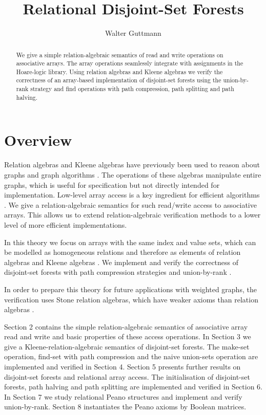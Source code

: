 \documentclass[11pt,a4paper]{article}
\begin{document}
\title{Relational Disjoint-Set Forests}
\author{Walter Guttmann}
\maketitle

\begin{abstract}
  We give a simple relation-algebraic semantics of read and write operations on associative arrays.
  The array operations seamlessly integrate with assignments in the Hoare-logic library.
  Using relation algebras and Kleene algebras we verify the correctness of an array-based implementation of disjoint-set forests using the union-by-rank strategy and find operations with path compression, path splitting and path halving.
\end{abstract}

\tableofcontents

\section{Overview}

Relation algebras and Kleene algebras have previously been used to reason about graphs and graph algorithms \cite{BackhouseCarre1975,Berghammer1999,BerghammerStruth2010,BerghammerKargerWolf1998,GondranMinoux2008,HoefnerMoeller2012,Moeller1993}.
The operations of these algebras manipulate entire graphs, which is useful for specification but not directly intended for implementation.
Low-level array access is a key ingredient for efficient algorithms \cite{CormenLeisersonRivest1990}.
We give a relation-algebraic semantics for such read/write access to associative arrays.
This allows us to extend relation-algebraic verification methods to a lower level of more efficient implementations.

In this theory we focus on arrays with the same index and value sets, which can be modelled as homogeneous relations and therefore as elements of relation algebras and Kleene algebras \cite{Kozen1994,Tarski1941}.
We implement and verify the correctness of disjoint-set forests with path compression strategies and union-by-rank \cite{CormenLeisersonRivest1990,GallerFisher1964,Tarjan1975}.

In order to prepare this theory for future applications with weighted graphs, the verification uses Stone relation algebras, which have weaker axioms than relation algebras \cite{Guttmann2018c}.

Section 2 contains the simple relation-algebraic semantics of associative array read and write and basic properties of these access operations.
In Section 3 we give a Kleene-relation-algebraic semantics of disjoint-set forests.
The make-set operation, find-set with path compression and the naive union-sets operation are implemented and verified in Section 4.
Section 5 presents further results on disjoint-set forests and relational array access.
The initialisation of disjoint-set forests, path halving and path splitting are implemented and verified in Section 6.
In Section 7 we study relational Peano structures and implement and verify union-by-rank.
Section 8 instantiates the Peano axioms by Boolean matrices.
\end{document}
